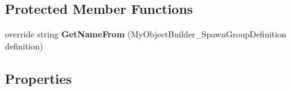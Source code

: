\subsection*{Protected Member Functions}
\begin{DoxyCompactItemize}
\item 
\hypertarget{class_s_e_mod_a_p_i_1_1_a_p_i_1_1_definitions_1_1_spawn_group_definition_ada2b4347a9a6ac9eef6b3027d491a03d}{}override string {\bfseries Get\+Name\+From} (My\+Object\+Builder\+\_\+\+Spawn\+Group\+Definition definition)\label{class_s_e_mod_a_p_i_1_1_a_p_i_1_1_definitions_1_1_spawn_group_definition_ada2b4347a9a6ac9eef6b3027d491a03d}

\end{DoxyCompactItemize}
\subsection*{Properties}
